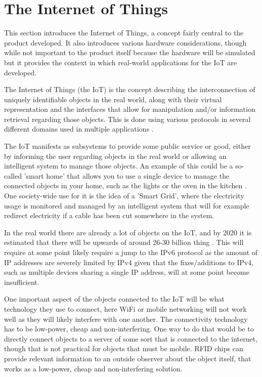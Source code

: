 \section{The Internet of Things}
This section introduces the Internet of Things, a concept fairly central to the product developed. It also introduces various hardware considerations, though while not important to the product itself because the hardware will be simulated but it provides the context in which real-world applications for the IoT are developed.

The Internet of Things (the IoT) is the concept describing the interconnection of uniquely identifiable objects in the real world, along with their virtual representation and the interfaces that allow for manipulation and/or information retrieval regarding those objects.
This is done using various protocols in several different domains used in multiple applications \citep{misc:InternetOfThingsDefinition} \citep{misc:InternetOfThingsDefinition2} \citep{misc:InternetOfThingsDefinition3}.

The IoT manifests as subsystems to provide some public service or good, either by informing the user regarding objects in the real world or allowing an intelligent system to manage those objects.
An example of this could be a so-called 'smart home' that allows you to use a single device to manage the connected objects in your home, such as the lights or the oven in the kitchen \citep{misc:InternetOfThingsExamples}.
One society-wide use for it is the idea of a 'Smart Grid', where the electricity usage is monitored and managed by an intelligent system that will for example redirect electricity if a cable has been cut somewhere in the system\citep{misc:smartGrid}.

In the real world there are already a lot of objects on the IoT, and by 2020 it is estimated that there will be upwards of around 26-30 billion thing \citep{misc:IoTGrowth1}\citep{misc:IoTGrowth2}.
This will require at some point likely require a jump to the IPv6 protocol as the amount of IP addresses are severely limited by IPv4\citep{misc:numberOfAddresses} given that the fixes/additions to IPv4, such as multiple devices sharing a single IP address, will at some point become insufficient.

One important aspect of the objects connected to the IoT will be what technology they use to connect, here WiFi or mobile networking will not work well as they will likely interfere with one another.
The connectivity technology has to be low-power, cheap and non-interfering.
One way to do that would be to directly connect objects to a server of some sort that is connected to the internet, though that is not practical for objects that must be mobile.
RFID chips can provide relevant information to an outside observer about the object itself, that works as a low-power, cheap and non-interfering solution.

